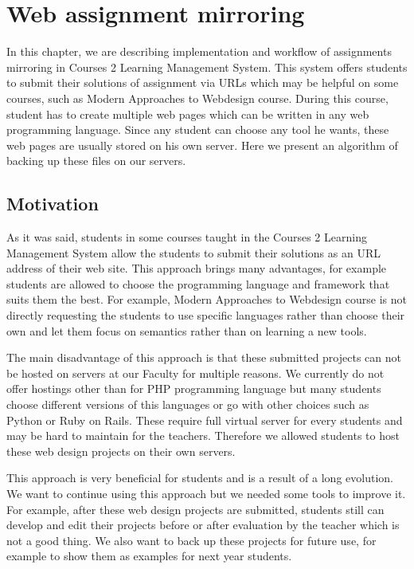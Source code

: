 \chapter{Web assignment mirroring}
\label{sec:mirroring}

In this chapter, we are describing implementation and workflow of assignments mirroring in Courses 2 Learning Management System. This system offers students to submit their solutions of assignment via URLs which may be helpful on some courses, such as Modern Approaches to Webdesign course. During this course, student has to create multiple web pages which can be written in any web programming language. Since any student can choose any tool he wants, these web pages are usually stored on his own server. Here we present an algorithm of backing up these files on our servers.

\section{Motivation}
As it was said, students in some courses taught in the Courses 2 Learning Management System allow the students to submit their solutions as an URL address of their web site. This approach brings many advantages, for example students are allowed to choose the programming language and framework that suits them the best. For example, Modern Approaches to Webdesign course is not directly requesting the students to use specific languages rather than choose their own and let them focus on semantics rather than on learning a new tools.

The main disadvantage of this approach is that these submitted projects can not be hosted on servers at our Faculty for multiple reasons. We currently do not offer hostings other than for PHP programming language but many students choose different versions of this languages or go with other choices such as Python or Ruby on Rails. These require full virtual server for every students and may be hard to maintain for the teachers. Therefore we allowed students to host these web design projects on their own servers.

This approach is very beneficial for students and is a result of a long evolution. We want to continue using this approach but we needed some tools to improve it. For example, after these web design projects are submitted, students still can develop and edit their projects before or after evaluation by the teacher which is not a good thing. We also want to back up these projects for future use, for example to show them as examples for next year students.

